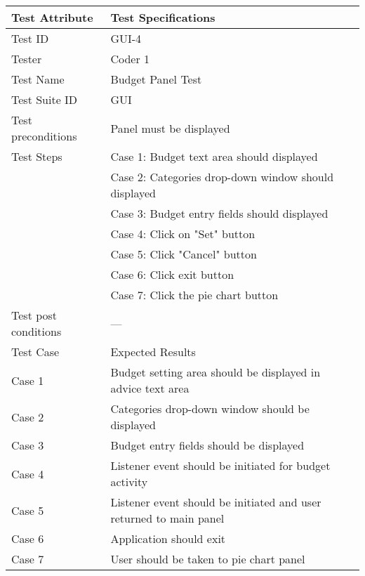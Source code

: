 \documentclass{article}
\begin{document}
\begin{table}[htbp]
\begin{center}
\begin{tabular}{|l | l|}
\hline
Test Attribute & Test Specifications \\
\hline
Test ID & GUI-4 \\
\hline
Tester  & Coder 1 \\
\hline

Test Name  & Budget Panel Test \\
\hline
Test Suite  ID& GUI \\

\hline
 Test preconditions & Panel must be displayed \\
\hline
Test Steps & Case 1: Budget text area should displayed \\
\hline
  & Case 2: Categories drop-down window should displayed  \\
\hline
  & Case 3: Budget entry fields should displayed  \\
\hline
  & Case 4: Click on "Set" button  \\
\hline
& Case 5: Click "Cancel" button  \\
\hline
& Case 6: Click exit button  \\
\hline
& Case 7: Click the pie chart button\\
\hline

Test post conditions & --- \\
\hline
Test Case &Expected Results\\
\hline
Case 1 & Budget setting area should be displayed in advice text area  \\
\hline
Case 2 &  Categories drop-down window should be displayed  \\
\hline
Case 3  &  Budget entry fields should be displayed  \\
\hline
Case 4  &  Listener event should be initiated for budget activity  \\
\hline
Case 5 &  Listener event should be initiated and user returned to main panel \\
\hline
Case 6 &  Application should exit  \\
\hline
Case 7 &  User should be taken to pie chart panel  \\
\hline


\end{tabular}
\end{center}
\end{table}
\end{document}
